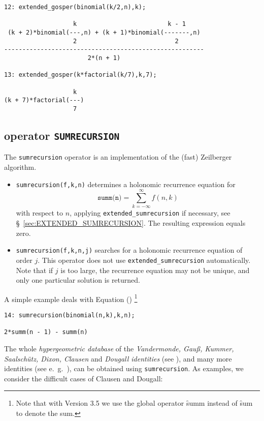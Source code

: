 {\small
\begin{verbatim}
12: extended_gosper(binomial(k/2,n),k);

                   k                         k - 1
 (k + 2)*binomial(---,n) + (k + 1)*binomial(-------,n)
                   2                           2
-------------------------------------------------------
                       2*(n + 1)

13: extended_gosper(k*factorial(k/7),k,7);

                   k
(k + 7)*factorial(---)
                   7
\end{verbatim}
}\noindent

\subsection{\REDUCE{} operator \texttt{SUMRECURSION}}
\hypertarget{operator:SUMRECURSION}{}

The \texttt{sumrecursion} operator is an implementation of the (fast)
Zeilberger algorithm.
\begin{itemize}
\item
\texttt{sumrecursion(f,k,n)} determines a holonomic recurrence equation
for
\[
\texttt{summ(n)} =\sum\limits_{k=-\infty}^\infty f(n,k)
\]
with respect to $n$, applying
\texttt{extended\_sumrecursion} if necessary,
see \S~\ref{sec:EXTENDED_SUMRECURSION}.
The resulting expression equals zero.
\item
\texttt{sumrecursion(f,k,n,j)} %
searches for a holonomic recurrence equation of order $j$. This
operator does not use \texttt{extended\_sumrecursion} automatically.
Note that if $j$ is too large, the recurrence equation
may not be unique, and only one particular solution is returned.
\end{itemize}
A simple example deals with Equation ()%
\footnote{Note that with \REDUCE{} Version 3.5 we use the global operator
\hypertarget{operator:SUMM}{\f{summ}} instead of \f{sum} to denote the sum.}

{\small
\begin{verbatim}
14: sumrecursion(binomial(n,k),k,n);

2*summ(n - 1) - summ(n)
\end{verbatim}
}\noindent
The whole \textsl{hypergeometric database} of the
\textsl{Vandermonde, Gau{\ss}, Kummer, Saal\-sch\"utz, Dixon, Clausen} and \textsl{Dougall
identities} (see \cite{Wilf:93}), and many more identities (see e.\ g.\
\cite{Koepf:94b}), can be obtained using \texttt{sumrecursion}.
As examples, we consider the difficult cases of Clausen and Dougall:%

